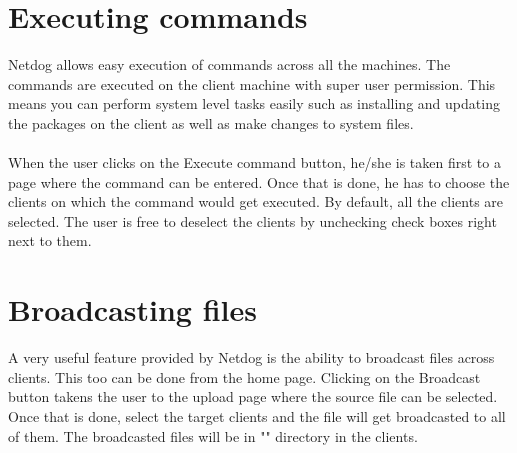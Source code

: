 \section{Executing commands}

Netdog allows easy execution of commands across all the machines. The commands
are executed on the client machine with super user permission. This means you
can perform system level tasks easily such as installing and updating the
packages on the client as well as make changes to system files.
\\\\
When the user clicks on the Execute command button, he/she is taken first to a
page where the command can be entered. Once that is done, he has to choose the
clients on which the command would get executed. By default, all the clients
are selected. The user is free to deselect the clients by unchecking check
boxes right next to them.

\section{Broadcasting files}

A very useful feature provided by Netdog is the ability to broadcast files
across clients. This too can be done from the home page. Clicking on the
Broadcast button takens the user to the upload page where the source file can
be selected. Once that is done, select the target clients and the file will get
broadcasted to all of them. The broadcasted files will be in "\share" directory
in the clients.
\\\\


\newpage 

